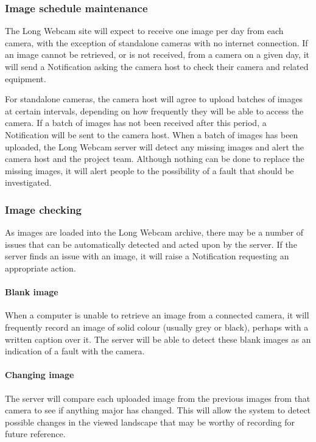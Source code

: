 \documentclass[11pt]{article}
\begin{document}
\subsubsection{Image schedule maintenance}
The Long Webcam site will expect to receive one image per day from each camera, with the exception of standalone cameras with no internet connection. If an image cannot be retrieved, or is not received, from a camera on a given day, it will send a Notification asking the camera host to check their camera and related equipment.

For standalone cameras, the camera host will agree to upload batches of images at certain intervals, depending on how frequently they will be able to access the camera. If a batch of images has not been received after this period, a Notification will be sent to the camera host. When a batch of images has been uploaded, the Long Webcam server will detect any missing images and alert the camera host and the project team. Although nothing can be done to replace the missing images, it will alert people to the possibility of a fault that should be investigated.

\subsubsection{Image checking}
As images are loaded into the Long Webcam archive, there may be a number of issues that can be automatically detected and acted upon by the server. If the server finds an issue with an image, it will raise a Notification requesting an appropriate action.

\paragraph{Blank image}
When a computer is unable to retrieve an image from a connected camera, it will frequently record an image of solid colour (usually grey or black), perhaps with a written caption over it. The server will be able to detect these blank images as an indication of a fault with the camera.

\paragraph{Changing image}
The server will compare each uploaded image from the previous images from that camera to see if anything major has changed. This will allow the system to detect possible changes in the viewed landscape that may be worthy of recording for future reference.
\end{document}
